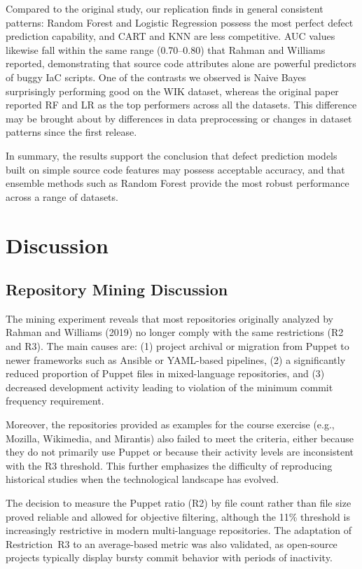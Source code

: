 \documentclass[conference]{IEEEtran}
\begin{document}
Compared to the original study, our replication finds in general consistent patterns:
Random Forest and Logistic Regression possess the most perfect defect prediction capability, and CART and KNN are less competitive.
AUC values likewise fall within the same range (0.70–0.80) that Rahman and Williams reported, demonstrating that source code attributes alone are powerful predictors of buggy IaC scripts.
One of the contrasts we observed is Naive Bayes surprisingly performing good on the WIK dataset, whereas the original paper reported RF and LR as the top performers across all the datasets.
This difference may be brought about by differences in data preprocessing or changes in dataset patterns since the first release.

In summary, the results support the conclusion that defect prediction models built on simple source code features may possess acceptable accuracy, and that ensemble methods such as Random Forest provide the most robust performance across a range of datasets.


\section{Discussion}
\subsection{Repository Mining Discussion}
The mining experiment reveals that most repositories originally analyzed by Rahman and Williams (2019) no longer comply with the same restrictions (R2 and R3). The main causes are: (1) project archival or migration from Puppet to newer frameworks such as Ansible or YAML-based pipelines, (2) a significantly reduced proportion of Puppet files in mixed-language repositories, and (3) decreased development activity leading to violation of the minimum commit frequency requirement. 

Moreover, the repositories provided as examples for the course exercise (e.g., Mozilla, Wikimedia, and Mirantis) also failed to meet the criteria, either because they do not primarily use Puppet or because their activity levels are inconsistent with the R3 threshold. This further emphasizes the difficulty of reproducing historical studies when the technological landscape has evolved.

The decision to measure the Puppet ratio (R2) by file count rather than file size proved reliable and allowed for objective filtering, although the 11\% threshold is increasingly restrictive in modern multi-language repositories. The adaptation of Restriction~R3 to an average-based metric was also validated, as open-source projects typically display bursty commit behavior with periods of inactivity.
\end{document}
